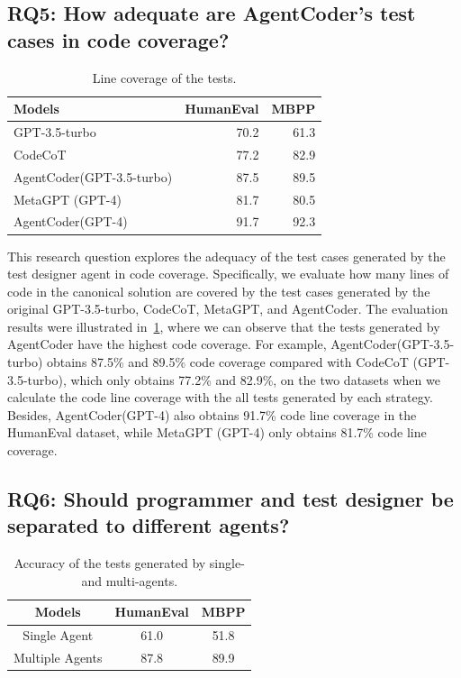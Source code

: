 \documentclass{article}
\newcommand{\xxx}{AgentCoder\xspace}
\begin{document}
\subsection{RQ5: How adequate are \xxx's test cases in code coverage?}

\begin{table}\scriptsize
    \centering
    \vspace{-0.65cm}
    \caption{Line coverage of the tests.}
    \begin{tabular}{lrr}
    \toprule
    Models&HumanEval&MBPP\\
    \midrule
    GPT-3.5-turbo&70.2&61.3\\
    CodeCoT&77.2&82.9\\
 \xxx (GPT-3.5-turbo)&87.5&89.5\\
 \hline
 MetaGPT (GPT-4) &81.7&80.5\\
 \xxx (GPT-4)&91.7&92.3\\
         \bottomrule
    \end{tabular}
    \label{tab:coverage}
\end{table}
This research question explores the adequacy of the test cases generated by the test designer agent in code coverage. Specifically, we evaluate how many lines of code in the canonical solution are covered by the test cases generated by the original GPT-3.5-turbo, CodeCoT, MetaGPT, and \xxx. The evaluation results were illustrated in~\cref{tab:coverage}, where we can observe that the tests generated by \xxx have the highest code coverage. For example, \xxx (GPT-3.5-turbo) obtains 87.5\% and 89.5\% code coverage compared with CodeCoT (GPT-3.5-turbo), which only obtains 77.2\% and 82.9\%, on the two datasets when we calculate the code line coverage with the all tests generated by each strategy. Besides, \xxx (GPT-4) also obtains 91.7\% code line coverage in the HumanEval dataset, while MetaGPT (GPT-4) only obtains 81.7\% code line coverage.






\subsection{RQ6: Should programmer and test designer be separated to different agents?}


\begin{table}\scriptsize
    \centering
    \caption{Accuracy of the tests generated by single- and multi-agents.}
    \begin{tabular}{c|cc}
    \toprule
    Models&HumanEval&MBPP\\
    \midrule
         Single Agent&61.0&51.8\\
         Multiple Agents&87.8&89.9 \\
         \bottomrule
    \end{tabular}
    \label{tab:single_agent_tests}
\end{table}
\end{document}
